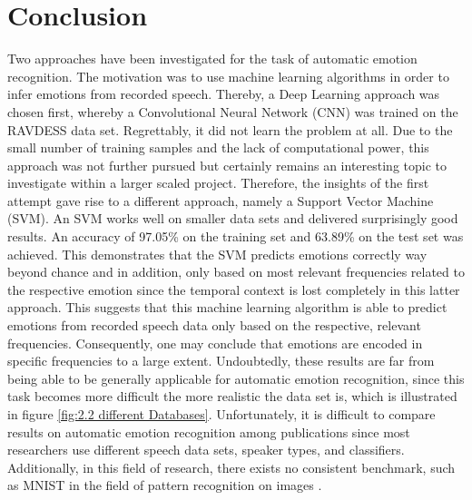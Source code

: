\documentclass[11pt,a4paper,twoside]{article}
\theoremstyle{thmbreak}
\numberwithin{Theorem}{subsection}
\theoremstyle{defbreak}
\theoremstyle{remark}
\theoremstyle{remark}
\begin{document}






\section{Conclusion}
Two approaches have been investigated for the  task of automatic emotion recognition. 
The motivation was to use machine learning algorithms in order to infer emotions from recorded speech. 
Thereby, a Deep Learning approach was chosen first, whereby a Convolutional Neural Network (CNN) was trained on the RAVDESS data set. 
Regrettably, it did not learn the problem at all. Due to the small number of training samples and the lack of computational power, this approach was not further pursued but certainly remains an interesting topic to investigate within a larger scaled project. 
Therefore, the insights of the first attempt gave rise to a different approach, namely a  Support Vector Machine (SVM).
An SVM works well on smaller data sets and delivered surprisingly good results. An accuracy of 97.05\% on the training set and 63.89\% on the test set was achieved. 
This demonstrates that the SVM predicts emotions correctly way beyond chance and in addition, only based on most relevant frequencies related to the respective emotion since the temporal context is lost completely in this latter approach.
This suggests that this machine learning algorithm is able to predict emotions from recorded speech data only based on the respective, relevant frequencies. 
Consequently, one may conclude that emotions are encoded in specific frequencies to a large extent. 
Undoubtedly, these results are far from being able to be generally applicable for automatic emotion recognition, since  this task  becomes more difficult the more realistic the data set is, which is illustrated in figure \ref{fig:2.2 different Databases}.
Unfortunately, it is difficult to compare results on automatic emotion recognition among publications since most researchers use different speech data sets,  speaker types, and  classifiers. Additionally, in this field of research, there exists no consistent  benchmark, such as MNIST in the field of pattern recognition on images \cite{mnist}.
\end{document}
